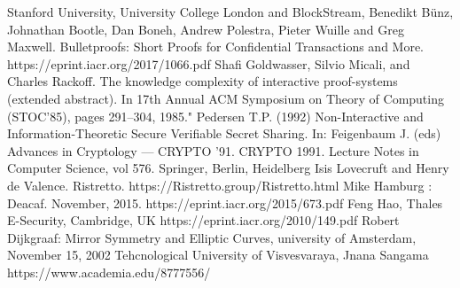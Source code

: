 \documentclass{article}
\begin{document}
\begin{thebibliography}{99}

 Stanford University, University College London and BlockStream, Benedikt Bünz, Johnathan Bootle, Dan Boneh, Andrew Polestra, Pieter Wuille and Greg Maxwell. Bulletproofs: Short Proofs for Confidential Transactions and More.\\ https://eprint.iacr.org/2017/1066.pdf
 Shafi Goldwasser, Silvio Micali, and Charles Rackoff. The knowledge complexity of interactive
proof-systems (extended abstract). In 17th Annual ACM Symposium on Theory of Computing
(STOC’85), pages 291–304, 1985."
 Pedersen T.P. (1992) Non-Interactive and Information-Theoretic Secure Verifiable Secret Sharing. In: Feigenbaum J. (eds) Advances in Cryptology — CRYPTO ’91. CRYPTO 1991. Lecture Notes in Computer Science, vol 576. Springer, Berlin, Heidelberg
 Isis Lovecruft and Henry de Valence. Ristretto. https://Ristretto.group/Ristretto.html
 Mike Hamburg : Deacaf. November, 2015. https://eprint.iacr.org/2015/673.pdf
 Feng Hao, Thales E-Security, Cambridge, UK https://eprint.iacr.org/2010/149.pdf
Robert Dijkgraaf: Mirror Symmetry and Elliptic Curves, university of Amsterdam, November 15, 2002
 Tehcnological University of Visvesvaraya, Jnana Sangama https://www.academia.edu/8777556/

\end{thebibliography}
\end{document}
